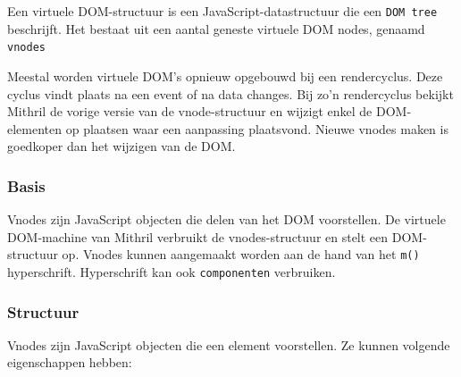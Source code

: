 Een virtuele DOM-structuur is een JavaScript-datastructuur die een \texttt{DOM tree} beschrijft. Het bestaat uit een aantal geneste virtuele DOM nodes, genaamd \texttt{vnodes} \autocite{Mithril2019g}

Meestal worden virtuele DOM's opnieuw opgebouwd bij een rendercyclus. Deze cyclus vindt plaats na een event of na data changes. Bij zo'n rendercyclus bekijkt Mithril de vorige versie van de vnode-structuur en wijzigt enkel de DOM-elementen op plaatsen waar een aanpassing plaatsvond. Nieuwe vnodes maken is goedkoper dan het wijzigen van de DOM. \autocite{Mithril2019g}

\subsubsection{Basis}

Vnodes zijn JavaScript objecten die delen van het DOM voorstellen. De virtuele DOM-machine van Mithril verbruikt de vnodes-structuur en stelt een DOM-structuur op. Vnodes kunnen aangemaakt worden aan de hand van het \texttt{m()} hyperschrift. Hyperschrift kan ook \texttt{componenten} verbruiken. \autocite{Mithril2019g}

\subsubsection{Structuur}

Vnodes zijn JavaScript objecten die een element voorstellen. Ze kunnen volgende eigenschappen hebben:

